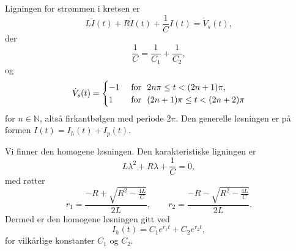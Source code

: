 \documentclass{article}
\theoremstyle{definition}
\newenvironment{customoppg}[1]
{\renewcommand\theinnercustomoppg{#1}\innercustomoppg}
{\endinnercustomoppg}
\theoremstyle{remark}
\begin{document}
\begin{multicols*}{2}
\begin{customoppg}{11}
  \leavevmode
  Ligningen for strømmen i kretsen er
\begin{equation} \label{eq:oppgave_ligning}
    L \ddot{I}(t) + R \dot{I}(t) + \frac{1}{C} I(t) = \dot{V}_s(t),
\end{equation}
der
\begin{equation*}
    \frac{1}{C} = \frac{1}{C_1} + \frac{1}{C_2},
\end{equation*}
og
\begin{equation*}
    \dot{V}_s(t) = 
    \begin{cases}
        -1 & \textnormal{ for }\ 2n \pi \leq t < (2n + 1) \pi, \\
        1 & \textnormal{ for }\ (2n + 1) \pi \leq t < (2n + 2) \pi
    \end{cases}
\end{equation*}
for $n \in \mathbb{N}$, altså firkantbølgen med periode $2\pi$. Den generelle løsningen er på formen $I(t) = I_h(t) + I_p(t)$.

Vi finner den homogene løsningen. Den karakteristiske ligningen er
\begin{equation*}
    L \lambda^2 + R \lambda + \frac{1}{C} = 0,
\end{equation*}
med røtter
\begin{equation*}
    r_1 = \frac{- R + \sqrt{R^2 - \frac{4L}{C}}}{2L}, \qquad r_2 = \frac{- R - \sqrt{R^2 - \frac{4L}{C}}}{2L}.
\end{equation*}
Dermed er den homogene løsningen gitt ved
\begin{equation*}
    I_h(t) = C_1 e^{r_1 t} + C_2 e^{r_2 t},
\end{equation*}
for vilkårlige konstanter $C_1$ og $C_2$.


\end{customoppg}
\end{multicols*}
\end{document}
